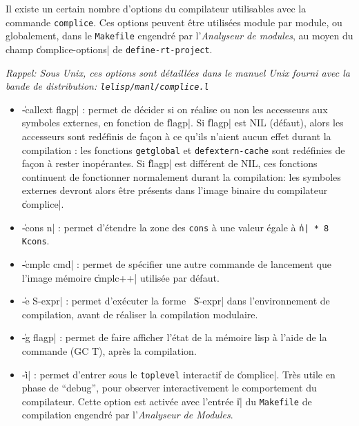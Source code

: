 Il existe un certain nombre d'options du compilateur utilisables
avec la commande {\tt complice}. Ces options peuvent \^{e}tre utilis\'{e}es
module par module, ou globalement, dans le {\tt Makefile} engendr\'{e}
par l'{\em Analyseur de modules}, au 
moyen du champ \|complice-options| de {\tt define-rt-project}.

{\it Rappel: Sous Unix, ces options sont d\'{e}taill\'{e}es dans le manuel
Unix fourni avec la bande de distribution: {\tt lelisp/manl/complice.l}}

\begin{itemize}
\item {\Large \|-callext flagp|} : permet de d\'{e}cider si on r\'{e}alise
ou non les accesseurs aux symboles externes, en fonction de \|flagp|.
Si \|flagp| est NIL (d\'{e}faut), alors les accesseurs sont red\'{e}finis
de fa\c{c}on \`{a} ce qu'ils n'aient aucun effet durant la compilation : les
fonctions {\tt getglobal} et {\tt defextern-cache} sont red\'{e}finies de
fa\c{c}on \`{a} rester inop\'{e}rantes. Si \|flagp| est diff\'{e}rent de NIL, ces
fonctions continuent de fonctionner normalement durant la compilation:
les symboles externes devront alors \^{e}tre pr\'{e}sents dans l'image
binaire du compilateur \|complice|.

\item {\Large \|-cons n|} : permet d'\'{e}tendre la zone des {\tt cons}
\`{a} une valeur \'{e}gale \`{a} {\tt \|n| * 8 Kcons}.

\item {\Large \|-cmplc cmd|} : permet de sp\'{e}cifier une autre commande
de lancement que l'image m\'{e}moire \|cmplc++| utilis\'{e}e par d\'{e}faut.

\item {\Large \|-e S-expr|} : permet d'ex\'{e}cuter la forme \LeLisp\
\|S-expr| dans l'environnement de compilation, avant de r\'{e}aliser la
compilation modulaire.

\item {\Large \|-g flagp|} : permet de faire afficher l'\'{e}tat de la
m\'{e}moire lisp \`{a} l'aide de la commande (GC T), apr\`{e}s la compilation.

\item {\Large \|-i|} : permet d'entrer sous le {\tt toplevel}
interactif de \|complice|. Tr\`{e}s utile en phase de ``debug{''}, pour
observer interactivement le comportement du compilateur. Cette option
est activ\'{e}e avec l'entr\'{e}e \|i| du {\tt Makefile} de compilation
engendr\'{e} par l'{\em Analyseur de Modules}.


\end{itemize}
